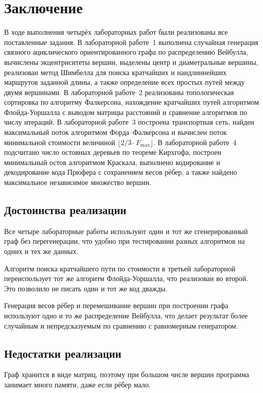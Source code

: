 \section*{Заключение}

В ходе выполнения четырёх лабораторных работ были реализованы все
поставленные задания. В лабораторной работе~1 выполнена случайная генерация
связного ациклического ориентированного графа по распределению Вейбулла,
вычислены экцентриситеты вершин, выделены центр и диаметральные вершины,
реализован метод Шимбелла для поиска кратчайших и наидлиннейших маршрутов
заданной длины, а также определение всех простых путей между двумя вершинами.
В лабораторной работе~2 реализованы топологическая сортировка по алгоритму
Фалкерсона, нахождение кратчайших путей алгоритмом Флойда-Уоршалла
с выводом матрицы расстояний и сравнение алгоритмов по числу итераций.
В лабораторной работе~3 построена транспортная сеть, найден максимальный поток
алгоритмом Форда--Фалкерсона и вычислен поток минимальной стоимости
величиной $\lfloor 2/3 \cdot F_{\max} \rfloor$.
В лабораторной работе~4 подсчитано число остовных деревьев по теореме Кирхгофа,
построен минимальный остов алгоритмом Краскала, выполнено кодирование
и декодирование кода Прюфера с сохранением весов рёбер, а также найдено
максимальное независимое множество вершин.

\subsection*{Достоинства реализации}

Все четыре лабораторные работы используют один и тот же сгенерированный граф
без перегенерации, что удобно при тестировании разных алгоритмов на одних
и тех же данных.

Алгоритм поиска кратчайшего пути по стоимости в третьей лабораторной
переиспользует тот же алгоритм Флойда-Уоршалла, что реализован во второй.
Это позволило не писать один и тот же код дважды.

Генерация весов рёбер и перемешивание вершин при построении графа
используют одно и то же распределение Вейбулла, что делает результат
более случайным и непредсказуемым по сравнению с равномерным генератором.

\subsection*{Недостатки реализации}

Граф хранится в виде матриц, поэтому при большом числе вершин программа
занимает много памяти, даже если рёбер мало.

